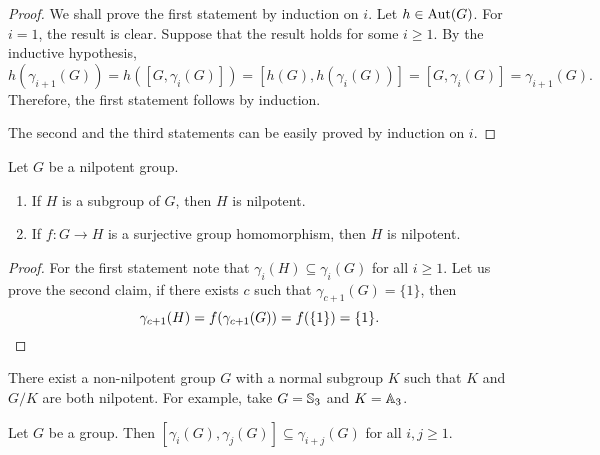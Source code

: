 \begin{proof}
    We shall prove the first statement by induction on $i$. Let $h\in \operatorname{Aut}(G)$. For $i=1$, the result is clear. Suppose that the result holds for some $i\geq 1$. By the inductive hypothesis,
    \[h(\gamma_{i+1}(G))=h([G,\gamma_i(G)])=[h(G),h(\gamma_i(G))]=[G,\gamma_i(G)]=\gamma_{i+1}(G).\]
    Therefore, the first statement follows by induction.
    
    The second and the third statements can be easily proved by induction on $i$.
\end{proof}


\begin{theorem}
	\label{theorem:nilpotent}
	Let $G$ be a nilpotent group. 
	\begin{enumerate}
		\item If $H$ is a subgroup of $G$, then $H$ is nilpotent. 
		\item If $f\colon G\to H$ is a surjective group homomorphism, then $H$ is nilpotent. 
	\end{enumerate}
\end{theorem}

\begin{proof}
	For the first statement note that $\gamma_i(H)\subseteq\gamma_i(G)$ for all 
	$i\geq 1$. Let us prove the second claim, if there exists $c$ such that $\gamma_{c+1}(G)=\{1\}$, 
	then 
	\[
	\gamma_{c+1}(H)=f(\gamma_{c+1}(G))=f(\{1\})=\{1\}.\qedhere
	\]
\end{proof}


There exist a non-nilpotent group $G$ with a normal subgroup $K$ 
such that $K$ and $G/K$ are both nilpotent. For example, take $G=\mathbb{S}_3$ and $K=\mathbb{A}_3$. 


\begin{theorem}
	\label{theorem:gamma}
	Let $G$ be a group. Then $[\gamma_i(G),\gamma_j(G)]\subseteq
	\gamma_{i+j}(G)$ for all $i,j\geq1$.	
\end{theorem}

